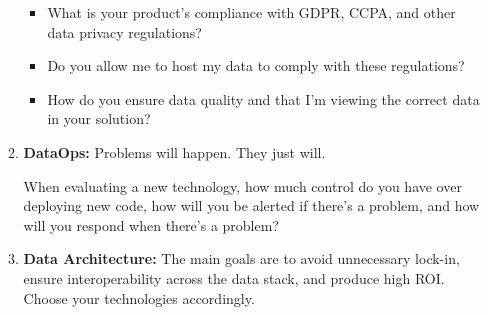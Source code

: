 \begin{itemize}
\begin{enumerate}
\begin{itemize}
            \item What is your product's compliance with GDPR,
            CCPA, and other data privacy regulations?

            \item Do you allow me to host my data to comply with
            these regulations?

            \item How do you ensure data quality and that I'm
            viewing the correct data in your solution?
        \end{itemize}

        \item \textbf{DataOps:} Problems will happen. They just will.
        
        When evaluating a new technology, how much control do you
        have over deploying new code, how will you be alerted if
        there's a problem, and how will you respond when there's
        a problem?

        \item \textbf{Data Architecture:}
        The main goals are to avoid unnecessary lock-in, ensure
        interoperability across the data stack, and produce high
        ROI. Choose your technologies accordingly.
    \end{enumerate}
\end{itemize}

